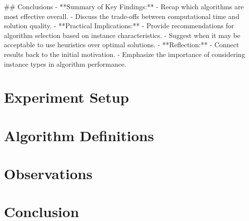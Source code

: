 \begin{markdown}
## Conclusions
- **Summary of Key Findings:**
  - Recap which algorithms are most effective overall.
  - Discuss the trade-offs between computational time and solution quality.
- **Practical Implications:**
  - Provide recommendations for algorithm selection based on instance characteristics.
  - Suggest when it may be acceptable to use heuristics over optimal solutions.
- **Reflection:**
  - Connect results back to the initial motivation.
  - Emphasize the importance of considering instance types in algorithm performance.
\end{markdown}


\section{Experiment Setup}

\section{Algorithm Definitions} \label{sec:algorithm_definitions}

\section{Observations}

\section{Conclusion}
